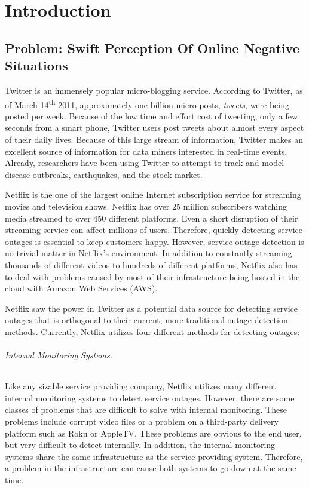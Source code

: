 \documentclass[12pt]{ucthesis}
\begin{document}
\pagestyle{plain}

\renewcommand{\baselinestretch}{1.66}

\part{Introduction}
\label{introduction}

\chapter{Problem: Swift Perception Of Online Negative Situations}
\label{general-problem}

Twitter is an immensely popular micro-blogging service. According to Twitter, as of March 14\textsuperscript{th} 2011,
approximately one billion micro-posts, \emph{tweets}, were being posted per week\cite{TwitterBlog}.
Because of the low time and effort cost of tweeting, only a few seconds from a smart phone,
Twitter users post tweets about almost every aspect of their daily lives.
Because of this large stream of information, Twitter makes an excellent source of information for
data miners interested in real-time events. Already, researchers have been using Twitter to attempt to track and model
disease outbreaks\cite{DetectingInfluenza}, earthquakes\cite{Earthquakes}, and the
stock market\cite{StockMarket}.

Netflix is the one of the largest online Internet subscription service for streaming movies and
television shows. Netflix has over 25 million subscribers watching media streamed to over 450 different
platforms. Even a short disruption of their streaming service can affect millions of users. Therefore, quickly detecting service outages
is essential to keep customers happy. However, service outage detection is no trivial matter in Netflix's
environment. In addition to constantly streaming thousands of different videos to hundreds of different platforms,
Netflix also has to deal with problems caused by most of their infrastructure being hosted in the cloud with
Amazon Web Services (AWS).

Netflix saw the power in Twitter as a potential data source for detecting service outages that
is orthogonal to their current, more traditional outage detection methods. Currently, Netflix utilizes four
different methods for detecting outages:

\paragraph{Internal Monitoring Systems.}
Like any sizable service providing company, Netflix utilizes many different internal monitoring
systems to detect service outages. However, there are some classes of problems that are difficult to solve
with internal monitoring. These problems include corrupt video files or a problem on a third-party delivery
platform such as Roku or AppleTV. These problems are obvious to the end user, but very difficult to detect internally.
In addition, the internal monitoring systems share the same infrastructure as the service providing system. Therefore,
a problem in the infrastructure can cause both systems to go down at the same time.
\end{document}
